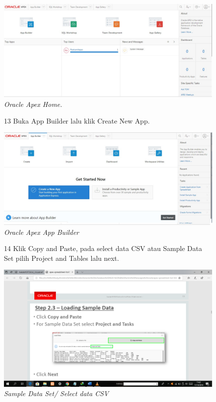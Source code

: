 \begin{enumerate}
\begin{figure}
    \begin{center}
\includegraphics[scale=0.4]{figures/pict(7).jpg}
    \caption{\textit{Oracle Apex Home.}}
        \end{center}
\label{gambar}
\end{figure}

\begin{figure}
\item[13] Buka App Builder lalu klik Create New App.

    \begin{center}
\includegraphics[scale=0.4]{figures/pict(8).jpg}
    \caption{\textit{Oracle Apex App Builder}}
        \end{center}
\label{gambar}
\end{figure}

\begin{figure}
\item[14] Klik Copy and Paste, pada select data CSV atau Sample Data Set pilih Project and Tables lalu next.

    \begin{center}
\includegraphics[scale=0.2]{figures/pict(9).png}
    \caption{\textit{Sample Data Set/ Select data CSV}}
        \end{center}
\label{gambar}
\end{figure}


\end{enumerate}
